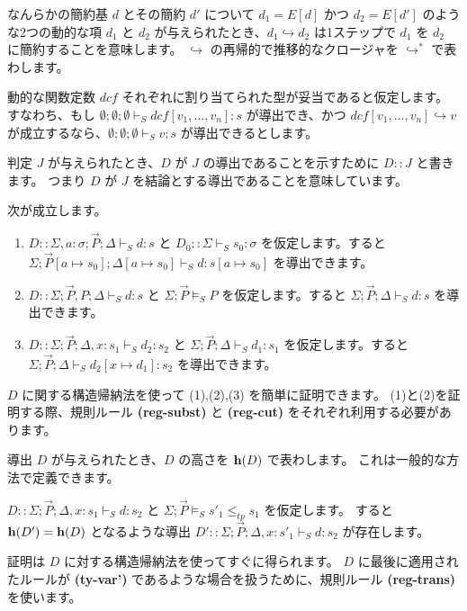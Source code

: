 \documentclass[submit,techreq,noauthor,onecolumn]{ipsj}
\begin{document}
\noindent なんらかの簡約基 $d$ とその簡約 $d'$ について $d_1 = E[d]$ かつ $d_2 = E[d']$ のような2つの動的な項 $d_1$ と $d_2$ が与えられたとき、$d_1 \hookrightarrow d_2$ は1ステップで $d_1$ を $d_2$ に簡約することを意味します。
$\hookrightarrow$ の再帰的で推移的なクロージャを $\hookrightarrow^*$ で表わします。

\noindent 動的な関数定数 $dcf$ それぞれに割り当てられた型が妥当であると仮定します。
すなわち、もし $\emptyset;\emptyset;\emptyset \vdash_S dcf[v_1,\ldots,v_n]:s$ が導出でき、かつ $dcf[v_1,\ldots,v_n] \hookrightarrow v$ が成立するなら、$\emptyset;\emptyset;\emptyset \vdash_S v:s$ が導出できるとします。

判定 $J$ が与えられたとき、$D$ が $J$ の導出であることを示すために $D :: J$ と書きます。
つまり $D$ が $J$ を結論とする導出であることを意味しています。

 次が成立します。

\begin{enumerate}
  \item $D :: \Sigma,a : \sigma; \vec{P}; \Delta \vdash_S d:s$ と $D_0 :: \Sigma \vdash_S s_0 : \sigma$ を仮定します。すると $\Sigma; \vec{P}[a \mapsto s_0]; \Delta[a \mapsto s_0] \vdash_S d:s[a \mapsto s_0]$ を導出できます。
  \item $D :: \Sigma; \vec{P},P; \Delta \vdash_S d:s$ と $\Sigma; \vec{P} \models_S P$ を仮定します。すると $\Sigma; \vec{P}; \Delta \vdash_S d:s$ を導出できます。
  \item $D :: \Sigma; \vec{P}; \Delta, x:s_1 \vdash_S d_2:s_2$ と $\Sigma; \vec{P}; \Delta \vdash_S d_1:s_1$ を仮定します。すると $\Sigma; \vec{P}; \Delta \vdash_S d_2[x \mapsto d_1]:s_2$ を導出できます。
\end{enumerate}

$D$ に関する構造帰納法を使って (1),(2),(3) を簡単に証明できます。
(1)と(2)を証明する際、規則ルール {\bf (reg-subst)} と {\bf (reg-cut)} をそれぞれ利用する必要があります。

\noindent 導出 $D$ が与えられたとき、$D$ の高さを ${\bf h}(D)$ で表わします。
これは一般的な方法で定義できます。

$D :: \Sigma; \vec{P}; \Delta, x:s_1 \vdash_S d:s_2$ と $\Sigma; \vec{P} \models_S s'_1 \leq_{tp} s_1$ を仮定します。
すると ${\bf h}(D') = {\bf h}(D)$ となるような導出 $D' :: \Sigma; \vec{P}; \Delta,x:s'_1 \vdash_S d:s_2$ が存在します。

証明は $D$ に対する構造帰納法を使ってすぐに得られます。
$D$ に最後に適用されたルールが {\bf (ty-var')} であるような場合を扱うために、規則ルール {\bf (reg-trans)} を使います。
\end{document}
